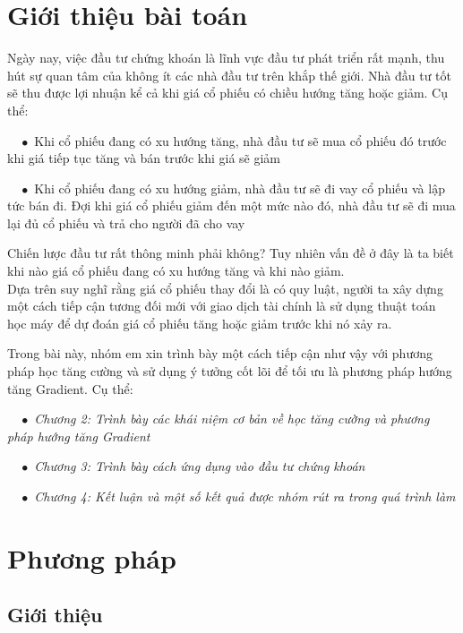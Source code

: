 \documentclass[14pt]{extreport}
\begin{document}
\tableofcontents
\newpage


\newpage
\chapter{Giới thiệu bài toán}

Ngày nay, việc đầu tư chứng khoán là lĩnh vực đầu tư phát triển rất mạnh, thu hút sự quan tâm của không ít các nhà đầu tư trên khắp thế giới. Nhà đầu tư tốt sẽ thu được lợi nhuận kể cả khi giá cổ phiếu có chiều hướng tăng hoặc giảm. Cụ thể:

$\quad \bullet$ Khi cổ phiếu đang có xu hướng tăng, nhà đầu tư sẽ mua cổ phiếu đó trước khi giá tiếp tục tăng và bán trước khi giá sẽ giảm

$\quad \bullet$ Khi cổ phiếu đang có xu hướng giảm, nhà đầu tư sẽ đi vay cổ phiếu và lập tức bán đi. Đợi khi giá cổ phiếu giảm đến một mức nào đó, nhà đầu tư sẽ đi mua lại đủ cổ phiếu và trả cho người đã cho vay

Chiến lược đầu tư rất thông minh phải không? Tuy nhiên vấn đề ở đây là ta biết khi nào giá cổ phiếu đang có xu hướng tăng và khi nào giảm.
\\ 

Dựa trên suy nghĩ rằng giá cổ phiếu thay đổi là có quy luật, người ta xây dựng một cách tiếp cận tương đối mới với giao dịch tài chính là sử dụng thuật toán học máy để dự đoán giá cổ phiếu tăng hoặc giảm trước khi nó xảy ra.

Trong bài này, nhóm em xin trình bày một cách tiếp cận như vậy với phương pháp học tăng cường và sử dụng ý tưởng cốt lõi để tối ưu là phương pháp hướng tăng Gradient. Cụ thể:

$\quad \bullet$ \textit{Chương 2: Trình bày các khái niệm cơ bản về học tăng cường và phương pháp hướng tăng Gradient}

$\quad \bullet$ \textit{Chương 3: Trình bày cách ứng dụng vào đầu tư chứng khoán}

$\quad \bullet$ \textit{Chương 4: Kết luận và một số kết quả được nhóm rút ra trong quá trình làm}

\chapter{Phương pháp}
\section{Giới thiệu}
\end{document}
